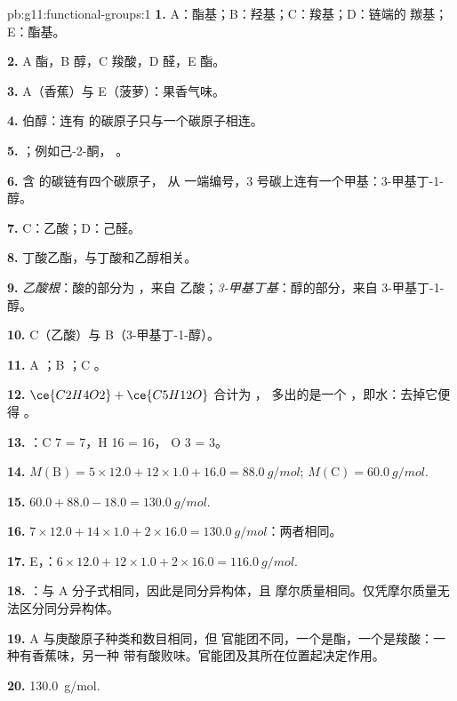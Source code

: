\begin{solution}{pb:g11:functional-groups:1}
\textbf{1.} A：酯基；B：羟基；C：羧基；D：链端的
羰基；E：酯基。

\textbf{2.} A 酯，B 醇，C 羧酸，D 醛，E 酯。

\textbf{3.} A（香蕉）与 E（菠萝）：果香气味。

\textbf{4.} 伯醇：连有  的碳原子只与一个碳原子相连。

\textbf{5.} ；例如己-2-酮，
。

\textbf{6.} 含  的碳链有四个碳原子，
从  一端编号，3 号碳上连有一个甲基：3-甲基丁-1-醇。

\textbf{7.} C：乙酸；D：己醛。

\textbf{8.} 丁酸乙酯，与丁酸和乙醇相关。

\textbf{9.} \emph{乙酸根}：酸的部分为 ，来自
乙酸；\emph{3-甲基丁基}：醇的部分，来自 3-甲基丁-1-醇。

\textbf{10.} C（乙酸）与 B（3-甲基丁-1-醇）。

\textbf{11.} A ；B ；C 。

\textbf{12.} $\ce{C2H4O2} + \ce{C5H12O}$ 合计为 ，
多出的是一个 ，即水：去掉它便得 。

\textbf{13.} ：C 7 = 7，H 16 = 16，
O 3 = 3。

\textbf{14.} $M(\text{B}) = 5 \times 12.0 + 12 \times 1.0 + 16.0 =
\qty{88.0}{g/mol}$; $M(\text{C}) = \qty{60.0}{g/mol}$.

\textbf{15.} $60.0 + 88.0 - 18.0 = \qty{130.0}{g/mol}$.

\textbf{16.} $7 \times 12.0 + 14 \times 1.0 + 2 \times 16.0 =
\qty{130.0}{g/mol}$：两者相同。

\textbf{17.} E，：$6 \times 12.0 + 12 \times 1.0 + 2 \times
16.0 = \qty{116.0}{g/mol}$.

\textbf{18.} ：与 A 分子式相同，因此是同分异构体，且
摩尔质量相同。仅凭摩尔质量无法区分同分异构体。

\textbf{19.} A 与庚酸原子种类和数目相同，但
官能团不同，一个是酯，一个是羧酸：一种有香蕉味，另一种
带有酸败味。官能团及其所在位置起决定作用。

\textbf{20.} \qty{130.0}{g/mol}.
\end{solution}
